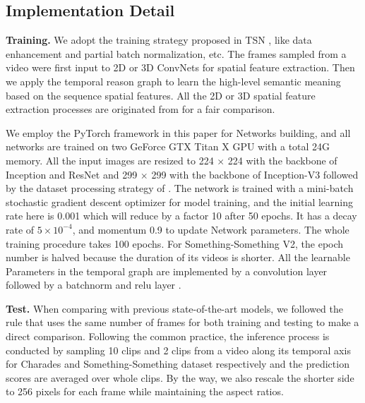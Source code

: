 \documentclass[conference,compsoc]{IEEEtran}
\begin{document}
\subsection{Implementation Detail}
    \textbf{Training.} We adopt the training strategy proposed in TSN \cite{wang2016temporal}, like data enhancement and partial batch normalization, etc. The frames sampled from a video were first input to 2D or 3D ConvNets for spatial feature extraction. Then we apply the temporal reason graph to learn the high-level semantic meaning based on the sequence spatial features. All the 2D or 3D spatial feature extraction processes are originated from \cite{wang2016temporal, wang2018non, wang2018videos} for a fair comparison.
    
    We employ the PyTorch framework \cite{paszke2017automatic} in this paper for Networks building, and all networks are trained on two GeForce GTX Titan X GPU with a total 24G memory. All the input images are resized to 224 $\times$ 224 with the backbone of Inception \cite{ioffe2015batch} and ResNet \cite{he2016deep} and 299 $\times$ 299 with the backbone of Inception-V3 \cite{szegedy2016rethinking} followed by the dataset processing strategy of \cite{wang2016temporal}. The network is trained with a mini-batch stochastic gradient descent optimizer for model training, and the initial learning rate here is 0.001 which will reduce by a factor 10 after 50 epochs. It has a decay rate of $5 \times 10^{-4}$, and momentum 0.9 to update Network parameters. The whole training procedure takes 100 epochs. For Something-Something V2, the epoch number is halved because the duration of its videos is shorter. All the learnable Parameters in the temporal graph are implemented by a convolution layer followed by a batchnorm \cite{ioffe2015batch} and relu layer \cite{glorot2011deep}.
    


    \textbf{Test.} When comparing with previous state-of-the-art models, we followed the rule that uses the same number of frames for both training and testing to make a direct comparison. Following the common practice, the inference process is conducted by sampling 10 clips and 2 clips from a video along its temporal axis for Charades and Something-Something dataset respectively and the prediction scores are averaged over whole clips. By the way, we also rescale the shorter side to 256 pixels for each frame while maintaining the aspect ratios.
    
    
    
\end{document}
